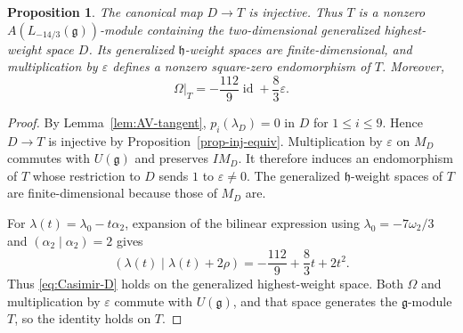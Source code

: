 \documentclass[11pt]{amsart}
\numberwithin{equation}{section}
\newtheorem{proposition}[theorem]{Proposition}
\theoremstyle{definition}
\theoremstyle{remark}
\newcommand{\g}{\mathfrak g}
\newcommand{\h}{\mathfrak h}
\newcommand{\D}{\mathbb D}
\newcommand{\HC}{\operatorname{HC}}
\newcommand{\id}{\operatorname{id}}
\begin{document}
\begin{proposition}\label{prop:T}
The canonical map $D\longrightarrow T$ is injective.
Thus $T$ is a nonzero $A(L_{-14/3}(\g))$-module containing the %
two-dimensional generalized highest-weight space $D$. Its generalized $\h$-weight
spaces are finite-dimensional, and multiplication by $\varepsilon$
defines a nonzero square-zero endomorphism of $T$.
Moreover,
\begin{equation}\label{eq:Casimir-D}
 \Omega|_T=-\frac{112}{9}\id+\frac83\varepsilon.
\end{equation}
\end{proposition}
\begin{proof}
By Lemma~\ref{lem:AV-tangent}, $p_i(\lambda_D)=0$ in $D$ for $1\leq i\leq9$.
Hence $D\longrightarrow T$ is injective by Proposition~\ref{prop-inj-equiv}.
Multiplication by $\varepsilon$ on $M_D$ commutes with $U(\g)$ and
preserves $IM_D$. It therefore induces an endomorphism of $T$ whose
restriction to $D$ sends $1$ to $\varepsilon\ne0$. The generalized
$\h$-weight spaces of $T$ are finite-dimensional because those of $M_D$ are.

For $\lambda(t)=\lambda_0-t\alpha_2$, expansion of the bilinear expression
using $\lambda_0=-7\omega_2/3$ and $(\alpha_2\mid\alpha_2)=2$ gives
\[
 (\lambda(t)\mid\lambda(t)+2\rho)
 =-\frac{112}{9}+\frac83t+2t^2.
\]
Thus \eqref{eq:Casimir-D} holds on the generalized highest-weight space.
Both $\Omega$ and multiplication by $\varepsilon$ commute with
$U(\g)$, and that space generates the $\g$-module $T$, so the identity holds on $T$.
\end{proof}
\end{document}
